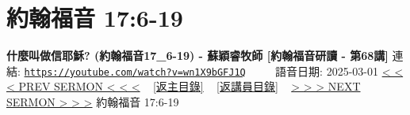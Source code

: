 \documentclass{book}
\begin{document}
\section{約翰福音 17:6-19}
\label{sec:wn1X9bGFJ1Q}
\textbf{什麼叫做信耶穌? (約翰福音17\_6-19) - 蘇穎睿牧師 [約翰福音研讀 - 第68講]}
\newline
\newline
連結: \href{https://youtube.com/watch?v=wn1X9bGFJ1Q}{\texttt{https://youtube.com/watch?v=wn1X9bGFJ1Q}} ~~~~ 語音日期: 2025-03-01
\newline
\newline
\hyperref[sec:wiDRWRXrtjM]{< < < PREV SERMON < < <}
~
\hyperlink{toc}{[返主目錄]}
~
\hyperref[ch:preacher11]{[返講員目錄]}
~
\hyperref[sec:cPwA4cZWWYs]{> > > NEXT SERMON > > >}
\newline
\newline
約翰福音 17:6-19
\newline
\end{document}
